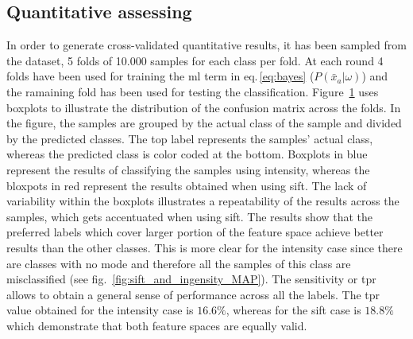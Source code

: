 \documentclass[a4paper, 10pt, conference]{llncs}      %
\begin{document}
\subsection{Quantitative assessing}
In order to generate cross-validated quantitative results, it has been sampled from the dataset, 5 folds of 10.000 samples for each class per fold. At each round 4 folds have been used for training the \ac{ml} term in eq.\,\ref{eq:bayes} ($P(\bar{x}_a|\omega)$) and the ramaining fold has been used for testing the classification. Figure~\ref{fig:quantitativeComparison} uses boxplots to illustrate the distribution of the confusion matrix across the folds. In the figure, the samples are grouped by the actual class of the sample and divided by the predicted classes. The top label represents the samples' actual class, whereas the predicted class is color coded at the bottom. Boxplots in blue represent the results of classifying the samples using intensity, whereas the bloxpots in red represent the results obtained when using \ac{sift}. The lack of variability within the boxplots illustrates a repeatability of the results across the samples, which gets accentuated when using \ac{sift}. The results show that the preferred labels which cover larger portion of the feature space achieve better results than the other classes. This is more clear for the intensity case since there are classes with no mode and therefore all the samples of this class are misclassified (see fig.~\ref{fig:sift_and_ingensity_MAP}). The sensitivity or \ac{tpr} allows to obtain a general sense of performance across all the labels. The \ac{tpr} value obtained for the intensity case is $16.6\%$, whereas for the \ac{sift} case is $18.8\%$ which demonstrate that both feature spaces are equally valid.



\begin{figure}[Htbp]

 
\caption{}
\label{fig:quantitativeComparison}
\end{figure}
\end{document}
